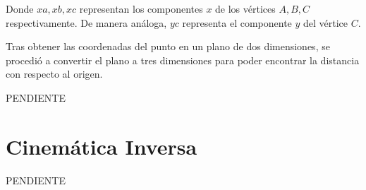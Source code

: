 \documentclass[titlepage, letterpaper, fleqn]{article}
\begin{document}
Donde $xa, xb, xc$ representan los componentes $x$ de los vértices $A, B, C$ respectivamente.
De manera análoga, $yc$ representa el componente $y$ del vértice $C$.

Tras obtener las coordenadas del punto en un plano de dos dimensiones, se procedió a convertir el plano a tres dimensiones para poder encontrar la distancia con respecto al origen.

PENDIENTE


\section{Cinemática Inversa} %
\label{sec:inverse}

PENDIENTE









\end{document}
